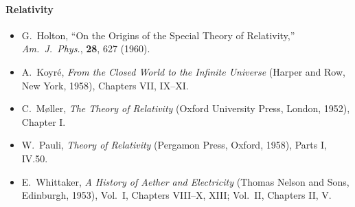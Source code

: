 \paragraph{Relativity}
\begin{itemize}
\renewcommand{\labelitemi}{\(\square\)}
  \item G.\ Holton, ``On the Origins of the Special Theory of Relativity,''
  \emph{Am.\ J.\ Phys.}, \textbf{28}, 627 (1960).
  \item A.\ Koyr\'e, \emph{From the Closed World to the Infinite Universe}
  (Harper and Row, New York, 1958), Chapters VII, IX--XI.
  \item C.\ M{\o}ller, \emph{The Theory of Relativity} (Oxford University
  Press, London, 1952), Chapter I.
  \item W.\ Pauli, \emph{Theory of Relativity} (Pergamon Press, Oxford,
  1958), Parts I, IV.50.
  \item E.\ Whittaker, \emph{A History of Aether and Electricity} (Thomas
  Nelson and Sons, Edinburgh, 1953), Vol.\ I, Chapters VIII--X, XIII; Vol.\
  II, Chapters II, V.
\end{itemize}

